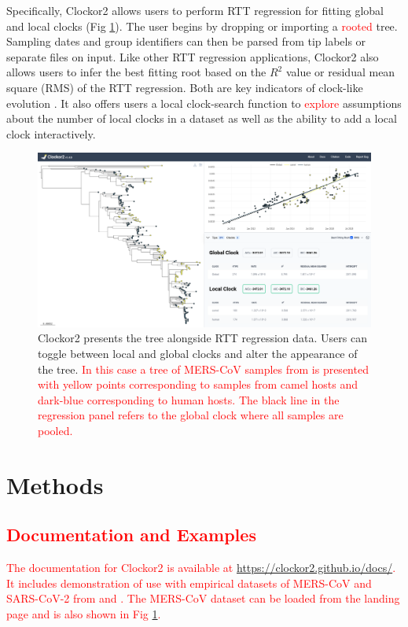 \documentclass{article}
\begin{document}
Specifically, Clockor2 allows users to perform RTT regression for fitting global and local clocks (Fig \ref{fig:ui}). The user begins by dropping or importing a \textcolor{red}{rooted} tree. Sampling dates and group identifiers can then be parsed from tip labels or separate files on input. Like other RTT regression applications, Clockor2 also allows users to infer the best fitting root based on the $R^2$ value or residual mean square (RMS) of the RTT regression. Both are key indicators of clock-like evolution \citep{rambaut_exploring_2016,drummond_inference_2003}. It also offers users a local clock-search function to \textcolor{red}{explore} assumptions about the number of local clocks in a dataset as well as the ability to add a local clock interactively.

\begin{figure}[H]
\centering
\includegraphics[width = 1\linewidth]{clockor2UI.pdf}
\caption{Clockor2 presents the tree alongside RTT regression data. Users can toggle between local and global clocks and alter the appearance of the tree. \textcolor{red}{In this case a tree of MERS-CoV samples from \citet{dudas_mers-cov_2018} is presented with yellow points corresponding to samples from camel hosts and dark-blue corresponding to human hosts. The black line in the regression panel refers to the global clock where all samples are pooled.}}
\label{fig:ui}
\end{figure}

\section*{Methods}
\textcolor{red}{
\subsection*{Documentation and Examples}
The documentation for Clockor2 is available at \url{https://clockor2.github.io/docs/}. It includes demonstration of use with empirical datasets of MERS-CoV and SARS-CoV-2 from \citet{dudas_mers-cov_2018} and \citet{porter2023evolutionary}. The MERS-CoV dataset can be loaded from the landing page and is also shown in Fig \ref{fig:ui}.}
\end{document}

